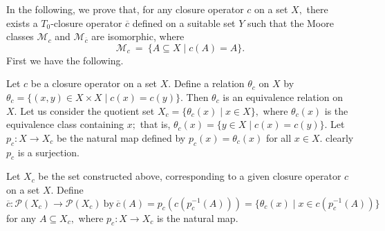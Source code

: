 \documentclass[
11pt,%
tightenlines,%
twoside,%
onecolumn,%
nofloats,%
nobibnotes,%
nofootinbib,%
superscriptaddress,%
noshowpacs,%
centertags]%
{revtex4}
\begin{document}
In the following, we prove that, for any  closure operator $c$ on a
set $X,$ there exists a $T_0$-closure operator $\overline{c}$
defined on a suitable set $Y$ such that the Moore classes
$\mathscr{M}_c$ and $\mathscr{M}_{\overline{c}}$ are isomorphic,
where
$$\mathscr{M}_c ~=~ \{ A \subseteq X \mid c(A)=A \}.$$ First we have the following.

\begin{definition}
\label{ch4sec3:def3} Let $c$ be a closure operator on a set $X.$
Define a relation $\theta_c$ on $X$ by $\theta_c = \{ (x,y) \in X
\times X \mid c(x) =  c(y) \}.$ Then $\theta _c$ is an equivalence
relation on $X.$ Let us consider the quotient set $X_c = \{ \theta _
c (x) \mid x \in X \},$ where $\theta_{c} (x)$  is the equivalence
class containing $x;$ that is, $\theta_c (x) = \{ y \in X  \mid c(x)
=  c(y) \}.$ Let $p_c : X \longrightarrow X_c$ be the natural map
defined by $p_c (x) = \theta _c (x)$ for all $x \in X.$  clearly
$p_c$ is a surjection.
\end{definition}

\begin{definition}
\label{ch4sec3:def4} Let $X_c$ be the set constructed above,
corresponding to a given  closure operator $c$ on a set $X.$ Define
$$
\overline{c}: \mathscr{P}(X_c) \longrightarrow  \mathscr{P}(X_c)
~\text{by}~ \overline{c}(A) = p_c (c(p_{c}^{-1}(A))) = \{ \theta_c (x) \mid x \in c(p_{c}^{-1}(A)) \}
$$  for any $A \subseteq X_c,$  where
$p_c : X \longrightarrow X_c$ is the natural map.
\end{definition}
\end{document}

